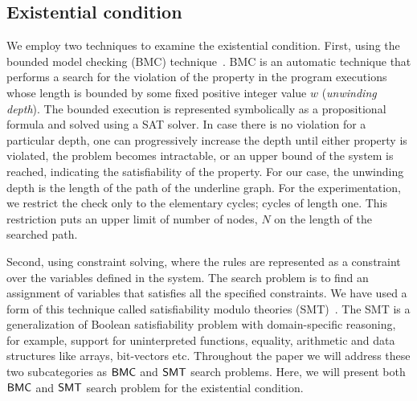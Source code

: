 \subsection{Existential condition}
\noindent We employ two techniques to examine the existential condition. 
%
First, using the bounded model checking (BMC) technique~\cite{biere1999symbolic1, biere2003bounded}.
%
%
BMC is an automatic technique that performs a search for the violation of the property in the program executions whose length is bounded by some fixed positive integer value $w$ (\textit{unwinding depth}). 
%
The bounded execution is represented symbolically as a propositional formula and solved using a SAT solver.
%
In case there is no violation for a particular depth, one can progressively increase the depth until either property is violated, the problem becomes intractable, or an upper bound of the system is reached, indicating the satisfiability of the property.
%
For our case, the unwinding depth is the length of the path of the underline graph.
%
%
For the experimentation, we restrict the check only to the elementary cycles; cycles of length one. 
%
This restriction puts an upper limit of number of nodes, $N$ on the length of the searched path. 
%
%

Second, using constraint solving, where the rules are represented as a constraint over the variables defined in the system.
%
The search problem is to find an assignment of variables that satisfies all the specified constraints.
%
We have used a form of this technique called satisfiability modulo theories (SMT)~\cite{nieuwenhuis2006solving, barrett2018satisfiability}.
%
The SMT is a generalization of Boolean satisfiability problem with domain-specific reasoning, for example, support for uninterpreted functions, equality, arithmetic and data structures like arrays, bit-vectors etc. 
%
%
Throughout the paper we will address these two subcategories as $\mathsf{BMC}$ and $\mathsf{SMT}$ search problems.
%
%
Here, we will present both $\mathsf{BMC}$ and $\mathsf{SMT}$ search problem for the existential condition.

